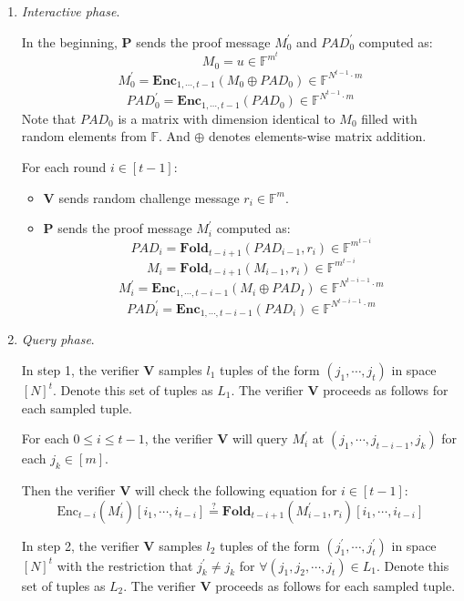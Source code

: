 \begin{enumerate}
    \item \textit{Interactive phase}. 
    
    In the beginning, $\textbf{P}$ sends the proof message $M_0^{\prime}$ and $PAD_0^{\prime}$ computed as:
$$
    M_0 = u \in \mathbb{F}^{m^t}
$$
$$
    M_0^{\prime} = \textbf{Enc}_{1,\cdots,t-1}(M_0 \oplus PAD_0) \in \mathbb{F}^{N^{t-1} \cdot m}
$$
$$
    PAD_0^{\prime} = \textbf{Enc}_{1,\cdots,t-1}(PAD_0) \in \mathbb{F}^{N^{t-1} \cdot m}
$$
    Note that $PAD_0$ is a matrix with dimension identical to $M_0$ filled with random elements from $\mathbb{F}$. And $\oplus$ denotes elements-wise matrix addition.
    
    For each round $i \in [t-1]$:
    \begin{itemize}
        \item $\textbf{V}$ sends random challenge message $r_i \in \mathbb{F}^m$.
        \item $\textbf{P}$ sends the proof message $M_i^{\prime}$ computed as:
$$
    PAD_i = \textbf{Fold}_{t-i+1}(PAD_{i-1}, r_i) \in \mathbb{F}^{m^{t-i}}
$$
$$
    M_i = \textbf{Fold}_{t-i+1}(M_{i-1}, r_i) \in \mathbb{F}^{m^{t-i}}
$$
$$
    M_i^\prime =  \textbf{Enc}_{1, \cdots, t- i - 1}(M_i \oplus PAD_I) \in \mathbb{F}^{N^{t-i-1} \cdot m}
$$
$$
    PAD_i^\prime =  \textbf{Enc}_{1, \cdots, t- i - 1}(PAD_i) \in \mathbb{F}^{N^{t-i-1} \cdot m}
$$

    \end{itemize}
    \item \textit{Query phase}. 
    
    In step 1, the verifier $\textbf{V}$ samples $l_1$ tuples of the form $(j_1, \cdots, j_t)$ in space $[N]^t$. Denote this set of tuples as $L_1$.
    The verifier $\textbf{V}$ proceeds as follows for each sampled tuple.
    
    For each $0 \le i \le t-1$, 
    the verifier $\textbf{V}$ will query $M_{i}^{\prime}$ at $(j_1, \cdots, j_{t-i-1}, j_k)$ for each $j_k \in [m]$. 
    
    Then the verifier $\textbf{V}$ will check the following equation for $i \in [t-1]$:
\begin{equation}
\label{eq:szkpctc_eq}
    \text{Enc}_{t-i}(M_i^\prime)[i_1, \cdots, i_{t-i}] \stackrel{?}{=} \textbf{Fold}_{t-i+1}(M_{i-1}^\prime, r_i) [i_1, \cdots, i_{t-i}]
\end{equation}

    In step 2, the verifier $\textbf{V}$ samples $l_2$ tuples of the form $(j_1^\prime, \cdots, j_t^\prime)$ in space $[N]^t$ with the restriction that $j_k^\prime \neq j_k$ for $\forall (j_1, j_2, \cdots, j_t) \in L_1$. Denote this set of tuples as $L_2$.
    The verifier $\textbf{V}$ proceeds as follows for each sampled tuple.
    

\end{enumerate}
